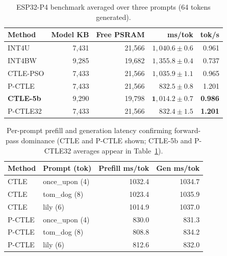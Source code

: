 \documentclass[10pt,journal]{IEEEtran}
\begin{document}
\begin{table}[t]
\centering
\footnotesize
\caption{ESP32-P4 benchmark averaged over three prompts (64 tokens generated).}
\label{tab:hw_esl}
\setlength{\tabcolsep}{4pt}
\renewcommand{\arraystretch}{1.12}
\begin{tabular}{lrrrr}
\hline
Method & Model KB & Free PSRAM & ms/tok & tok/s \\
\hline
INT4U & 7{,}431 & 21{,}566 & $1{,}040.6\pm0.6$ & 0.961 \\
INT4BW & 9{,}285 & 19{,}682 & $1{,}355.8\pm0.4$ & 0.737 \\
CTLE-PSO & 7{,}433 & 21{,}566 & $1{,}035.9\pm1.1$ & 0.965 \\
P-CTLE & 7{,}433 & 21{,}566 & $832.5\pm0.8$ & 1.201 \\
\hline
\textbf{CTLE-5b} & 9{,}290 & 19{,}798 & $\mathbf{1{,}014.2\pm0.7}$ & \textbf{0.986} \\
P-CTLE32 & 7{,}433 & 21{,}566 & $\mathbf{832.4\pm1.5}$ & \textbf{1.201} \\
\hline
\end{tabular}
\end{table}

\begin{table}[t]
\centering
\footnotesize
\caption{Per-prompt prefill and generation latency confirming forward-pass
dominance (CTLE and P-CTLE shown; CTLE-5b and P-CTLE32 averages appear in
Table~\ref{tab:hw_esl}).}
\label{tab:prompt_esl}
\setlength{\tabcolsep}{4pt}
\renewcommand{\arraystretch}{1.12}
\begin{tabular}{llrr}
\hline
Method & Prompt (tok) & Prefill ms/tok & Gen ms/tok \\
\hline
CTLE & once\_upon (4) & 1032.4 & 1034.7 \\
CTLE & tom\_dog (8) & 1023.4 & 1035.9 \\
CTLE & lily (6) & 1014.9 & 1037.0 \\
P-CTLE & once\_upon (4) & 830.0 & 831.3 \\
P-CTLE & tom\_dog (8) & 808.8 & 834.2 \\
P-CTLE & lily (6) & 812.6 & 832.0 \\
\hline
\end{tabular}
\end{table}
\end{document}
